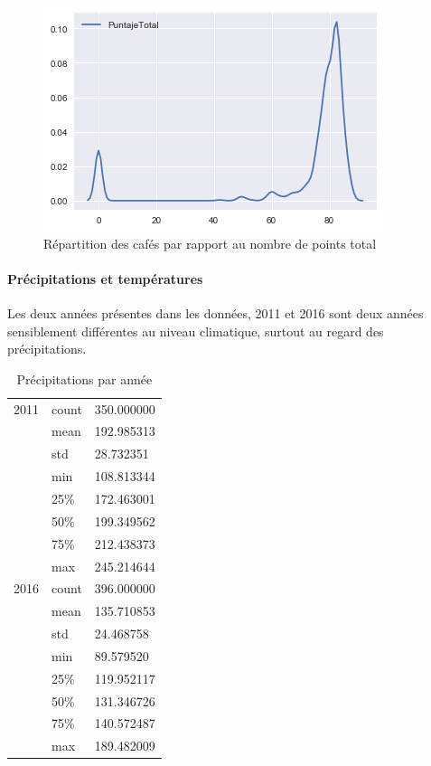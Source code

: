 \begin{figure}[H]
	\centering
	\includegraphics[width=0.7\linewidth]{img/Exploration/kdeplotPuntajeTotal}
	\caption{Répartition des cafés par rapport au nombre de points total}
	\label{fig:kdeplotpuntajetotal}
\end{figure}



\newpage
\paragraph{Précipitations et températures} Les deux années présentes dans les données, 2011 et 2016 sont deux années sensiblement différentes au niveau climatique, surtout au regard des précipitations.  

\begin{table}[H]
	\centering
	\caption{Précipitations par année}
	\label{YearlyPrec1}
	\begin{tabular}{lll}
		2011 & count                               & 350.000000 \\
		&mean & 192.985313                                      \\
		&std  & 28.732351                                       \\
		&min  & 108.813344                                     \\
		&25\% & 172.463001                                     \\
		&50\% & 199.349562                                      \\
		&75\% & 212.438373                                      \\
		&max  & 245.214644                                      \\
	2016 & count                               & 396.000000 \\
		&mean & 135.710853                                      \\
		&std  & 24.468758                                      \\
		&min  & 89.579520                                       \\
		&25\% & 119.952117                                      \\
		&50\% & 131.346726                                      \\
		&75\% & 140.572487                                      \\
		&max  & 189.482009                   
	\end{tabular}
\end{table}


